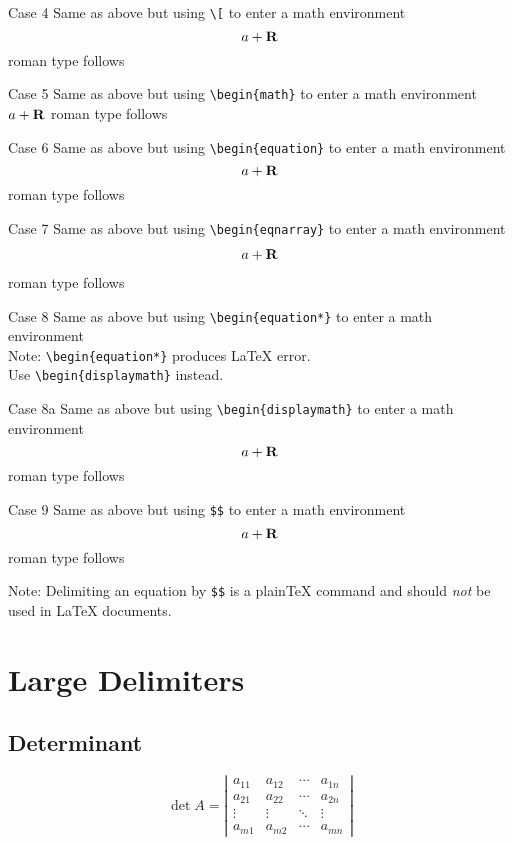 \documentclass{article}
\begin{document}
Case 4 Same as above but using \verb#\[# to enter a math environment \[a+\bf R\] 
roman type follows

Case 5 Same as above but using \verb#\begin{math}# to enter a math environment
\begin{math}a+\bf R\end{math} roman type follows

Case 6 Same as above but using \verb#\begin{equation}# to enter a math environment
\begin{equation}a+ \bf R\end{equation} roman type follows

Case 7 Same as above but using \verb#\begin{eqnarray}# to enter a math environment
\begin{eqnarray}a+ \bf R\end{eqnarray} roman type follows

Case 8 Same as above but using \verb#\begin{equation*}# to enter a math environment \\
Note: \verb#\begin{equation*}# produces LaTeX error.\\
Use \verb#\begin{displaymath}# instead.

Case 8a Same as above but using \verb#\begin{displaymath}# to enter a math environment
\begin{displaymath}a+ \bf R\end{displaymath} roman type follows

Case 9 Same as above but using \verb#$$# to enter a math environment
$$a+ \bf R$$ roman type follows

Note: Delimiting an equation by \verb|$$| is a plain\TeX{} command and
should \emph{not} be used in \LaTeX{} documents.


\section{Large Delimiters}

\subsection{Determinant}

\[
\det A = \left| \begin{array}{cccc}
a_{11} & a_{12} & \cdots & a_{1n}\\
a_{21} & a_{22} & \cdots & a_{2n}\\
\vdots & \vdots & \ddots & \vdots\\
a_{m1} & a_{m2} & \cdots & a_{mn}
\end{array} \right|
\]
\end{document}
